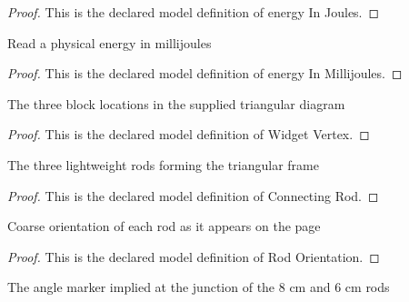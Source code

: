 \begin{proof}
  This is the declared model definition of energy In Joules.
\end{proof}
\begin{definition}
  \label{def:physics:phyx-mini-0698:phyxminiproblems-problemphyxmini0698-energyinmillijoules}
  Read a physical energy in millijoules
\end{definition}
\begin{proof}
  This is the declared model definition of energy In Millijoules.
\end{proof}
\begin{definition}
  \label{def:physics:phyx-mini-0698:phyxminiproblems-problemphyxmini0698-widgetvertex}
  The three block locations in the supplied triangular diagram
\end{definition}
\begin{proof}
  This is the declared model definition of Widget Vertex.
\end{proof}
\begin{definition}
  \label{def:physics:phyx-mini-0698:phyxminiproblems-problemphyxmini0698-connectingrod}
  The three lightweight rods forming the triangular frame
\end{definition}
\begin{proof}
  This is the declared model definition of Connecting Rod.
\end{proof}
\begin{definition}
  \label{def:physics:phyx-mini-0698:phyxminiproblems-problemphyxmini0698-rodorientation}
  Coarse orientation of each rod as it appears on the page
\end{definition}
\begin{proof}
  This is the declared model definition of Rod Orientation.
\end{proof}
\begin{definition}
  \label{def:physics:phyx-mini-0698:phyxminiproblems-problemphyxmini0698-vertexanglekind}
  The angle marker implied at the junction of the 8 cm and 6 cm rods
\end{definition}
